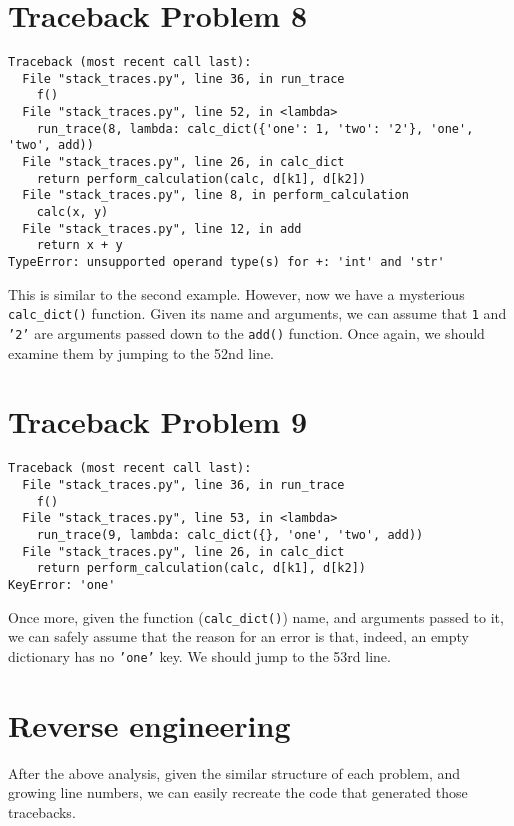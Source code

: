 \documentclass[8pt, a4paper]{article}
\begin{document}
\section*{Traceback Problem 8}

\begin{verbatim}
Traceback (most recent call last):
  File "stack_traces.py", line 36, in run_trace
    f()
  File "stack_traces.py", line 52, in <lambda>
    run_trace(8, lambda: calc_dict({'one': 1, 'two': '2'}, 'one', 'two', add))
  File "stack_traces.py", line 26, in calc_dict
    return perform_calculation(calc, d[k1], d[k2])
  File "stack_traces.py", line 8, in perform_calculation
    calc(x, y)
  File "stack_traces.py", line 12, in add
    return x + y
TypeError: unsupported operand type(s) for +: 'int' and 'str'

\end{verbatim}

This is similar to the second example. However, now we have a mysterious \texttt{calc_dict()} function. Given its name and arguments, we can assume that \texttt{1} and \texttt{'2'} are arguments passed down to the \texttt{add()} function. Once again, we should examine them by jumping to the 52nd line.

\section*{Traceback Problem 9}
\begin{verbatim}
Traceback (most recent call last):
  File "stack_traces.py", line 36, in run_trace
    f()
  File "stack_traces.py", line 53, in <lambda>
    run_trace(9, lambda: calc_dict({}, 'one', 'two', add))
  File "stack_traces.py", line 26, in calc_dict
    return perform_calculation(calc, d[k1], d[k2])
KeyError: 'one'
\end{verbatim}

Once more, given the function (\texttt{calc_dict()}) name, and arguments passed to it, we can safely assume that the reason for an error is that, indeed, an empty dictionary has no \texttt{'one'} key. We should jump to the 53rd line.

\section*{Reverse engineering}
After the above analysis, given the similar structure of each problem, and growing line numbers, we can easily recreate the code that generated those tracebacks. 
\end{document}
